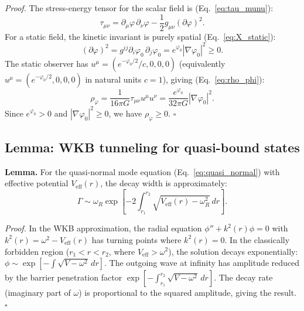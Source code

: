 \documentclass[aps,prd,onecolumn,superscriptaddress,nofootinbib,showpacs,12pt,notitlepage]{revtex4-2}
\begin{document}
\textit{Proof.}  The stress-energy tensor for the scalar field is
(Eq.~\ref{eq:tau_munu}):
\begin{equation}
  \tau_{\mu\nu} = \partial_\mu\varphi\,\partial_\nu\varphi
    - \frac{1}{2}g_{\mu\nu}(\partial\varphi)^2.
\end{equation}
For a static field, the kinetic invariant is purely spatial
(Eq.~\ref{eq:X_static}):
\begin{equation}
  (\partial\varphi)^2 = g^{ij}\partial_i\varphi_0\,\partial_j\varphi_0
  = e^{\varphi_0}|\nabla\varphi_0|^2 \geq 0.
\end{equation}
The static observer has $u^\mu = (e^{-\varphi_0/2}/c, 0, 0, 0)$
(equivalently $u^\mu = (e^{-\varphi_0/2}, 0, 0, 0)$ in
natural units $c = 1$), giving
(Eq.~\ref{eq:rho_phi}):
\begin{equation}
  \rho_\varphi = \frac{1}{16\pi G}\tau_{\mu\nu}u^\mu u^\nu
  = \frac{e^{\varphi_0}}{32\pi G}|\nabla\varphi_0|^2.
\end{equation}
Since $e^{\varphi_0} > 0$ and $|\nabla\varphi_0|^2 \geq 0$, we have
$\rho_\varphi \geq 0$. \hfill $\square$

\subsection{Lemma: WKB tunneling for quasi-bound states}
\label{app:lemma_wkb}

\textbf{Lemma.}  For the quasi-normal mode equation (Eq.~\ref{eq:quasi_normal})
with effective potential $V_{\mathrm{eff}}(r)$, the decay width is
approximately:
\begin{equation}
  \Gamma \sim \omega_R \exp\left[-2\int_{r_1}^{r_2}
    \sqrt{V_{\mathrm{eff}}(r) - \omega_R^2}\,dr\right].
\end{equation}

\textit{Proof.}  In the WKB approximation, the radial equation
$\phi'' + k^2(r)\phi = 0$ with $k^2(r) = \omega^2 - V_{\mathrm{eff}}(r)$
has turning points where $k^2(r) = 0$.  In the classically forbidden
region ($r_1 < r < r_2$, where $V_{\mathrm{eff}} > \omega^2$), the
solution decays exponentially: $\phi \sim \exp[-\int\sqrt{V-
\omega^2}\,dr]$.  The outgoing wave at infinity has amplitude
reduced by the barrier penetration factor $\exp[-\int_{r_1}^{r_2}
\sqrt{V-\omega^2}\,dr]$.  The decay rate (imaginary part of $\omega$)
is proportional to the squared amplitude, giving the result. \hfill $\square$
\end{document}
